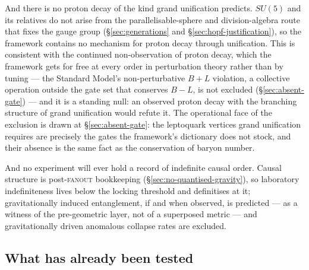 And there is no proton decay of the kind grand unification predicts. $SU(5)$ and its relatives do not
arise from the parallelisable-sphere and division-algebra route that fixes the gauge group
(\S\ref{sec:generations} and \S\ref{sec:hopf-justification}), so the framework contains no mechanism
for proton decay through unification. This is consistent with the continued non-observation of proton
decay, which the framework gets for free at every order in perturbation theory rather than by
tuning --- the Standard Model's non-perturbative $B+L$ violation, a collective operation outside
the gate set that conserves $B-L$, is not excluded (\S\ref{sec:absent-gate}) --- and it is a
standing null: an
observed proton decay with the branching structure of grand unification would refute it. The
operational face of the exclusion is drawn at \S\ref{sec:absent-gate}: the leptoquark vertices
grand unification requires are precisely the gates the framework's dictionary does not stock, and
their absence is the same fact as the conservation of baryon number.

And no experiment will ever hold a record of indefinite causal order. Causal structure is
post-\textsc{fanout} bookkeeping (\S\ref{sec:no-quantised-gravity}), so laboratory
indefiniteness lives below the locking threshold and definitises at it; gravitationally induced
entanglement, if and when observed, is predicted --- as a witness of the pre-geometric layer, not
of a superposed metric --- and gravitationally driven anomalous collapse rates are excluded.

\subsection{What has already been tested}

